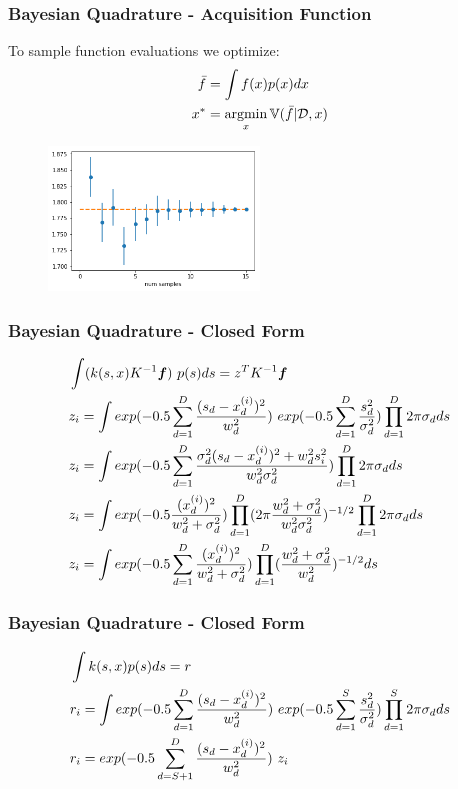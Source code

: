 \documentclass[11pt]{beamer}
\begin{document}
\begin{frame}
\frametitle{Bayesian Quadrature - Acquisition Function}
To sample function evaluations we optimize:
\begin{equation*}
\begin{split}
\bar{f} &= \int f(x)p(x)dx\\
x^{*} &= \operatorname*{argmin}_{x} \mathbb{V}(\bar{f} | \mathcal{D},\boldmath{x})
\end{split}
\end{equation*}
\begin{figure}
	\includegraphics[width=0.5\textwidth]{converge}
\end{figure}
\end{frame}


\begin{frame}
\frametitle{Bayesian Quadrature - Closed Form}
\begin{equation*}
\begin{split}
&\int (k(s,\boldmath{x}) K^{-1}\boldsymbol{f}) \ p(s) ds = z^{T} K^{-1}\boldsymbol{f} \\
&z_i = \int exp(-0.5 \sum_{d=1}^{D}\frac{(s_d - x^{(i)}_d)^2}{w_d^2} )\ exp(-0.5 \sum_{d=1}^{D}\frac{s_d^2}{\sigma_d^2} )\prod_{d=1}^{D} 2 \pi \sigma_d ds\\
&z_i = \int exp(-0.5 \sum_{d=1}^{D}\frac{\sigma_d^2(s_d - x^{(i)}_d)^2 + w_d^2 s_i^2}{w_d^2 \sigma_d^2} )\prod_{d=1}^{D} 2 \pi \sigma_d ds\\
&z_i = \int exp(-0.5 \frac{(x^{(i)}_d)^2}{w_d^2 + \sigma_d^2}) \prod_{d=1}^{D} (2 \pi \frac{w_d^2 + \sigma_d^2}{w_d^2 \sigma_d^2} )^{-1/2}  \prod_{d=1}^{D} 2 \pi \sigma_d ds\\
&z_i = \int exp(-0.5 \sum_{d=1}^{D} \frac{(x^{(i)}_d)^2}{w_d^2 + \sigma_d^2}) \prod_{d=1}^{D} (\frac{w_d^2 + \sigma_d^2}{w_d^2} )^{-1/2} ds \\
\end{split}
\end{equation*}
\end{frame}

\begin{frame}
\frametitle{Bayesian Quadrature - Closed Form}
\begin{equation*}
\begin{split}
&\int k(s,\boldmath{x})p(s) ds = r \\
&r_i = \int exp(-0.5 \sum_{d=1}^{D}\frac{(s_d - x^{(i)}_d)^2}{w_d^2} )\ exp(-0.5 \sum_{d=1}^{S}\frac{s_d^2}{\sigma_d^2} )\prod_{d=1}^{S} 2 \pi \sigma_d ds\\
&r_i = exp(-0.5 \sum_{d=S+1}^{D}\frac{(s_d - x^{(i)}_d)^2}{w_d^2} )\ z_i\\
\end{split}
\end{equation*}
\end{frame}
\end{document}

